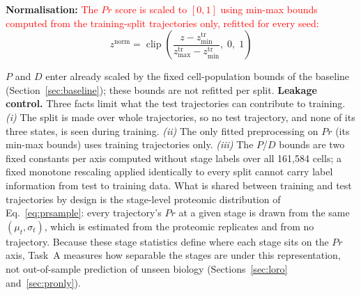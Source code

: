 \documentclass[5p,times,twocolumn]{elsarticle}
\newcommand{\rtag}[1]{}
\newcommand{\rev}[2]{\rtag{#1}\textcolor{red}{#2}}
\newenvironment{revblock}[1]{\par\color{red}\rtag{#1}\ignorespaces}{\par}
\begin{document}
\textbf{Normalisation:}
\rev{R2.6,AC}{The $Pr$ score is scaled to $[0,1]$ using min-max
  bounds computed from the training-split trajectories only,
  refitted for every seed:}
%
\begin{equation}
  z^{\text{norm}} =
    \operatorname{clip}\!\left(
      \frac{z - z^{\text{tr}}_{\min}}
           {z^{\text{tr}}_{\max} - z^{\text{tr}}_{\min}},\;
      0,\; 1
    \right)
  \label{eq:norm}
\end{equation}
\begin{revblock}{R2.6,AC}
  $P$ and $D$ enter already scaled by the fixed cell-population
  bounds of the baseline (Section~\ref{sec:baseline}); these
  bounds are not refitted per split.
  \textbf{Leakage control.} Three facts limit what the test
  trajectories can contribute to training.
  \textit{(i)} The split is made over whole trajectories, so no
  test trajectory, and none of its three states, is seen during
  training.
  \textit{(ii)} The only fitted preprocessing on $Pr$ (its
  min-max bounds) uses training trajectories only.
  \textit{(iii)} The $P$/$D$ bounds are two fixed constants per
  axis computed without stage labels over all 161,584 cells; a
  fixed monotone rescaling applied identically to every split
  cannot carry label information from test to training data.
  What is shared between training and test trajectories by
  design is the stage-level proteomic distribution of
  Eq.~\eqref{eq:prsample}: every trajectory's $Pr$ at a given
  stage is drawn from the same $(\mu_{t}, \sigma_{t})$, which is
  estimated from the proteomic replicates and from no
  trajectory. Because these stage statistics define where each
  stage sits on the $Pr$ axis, Task~A measures how separable the
  stages are under this representation, not out-of-sample
  prediction of unseen biology (Sections~\ref{sec:loro}
  and~\ref{sec:pronly}).
\end{revblock}
\end{document}

